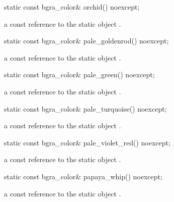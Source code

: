 \begin{itemdecl}
static const bgra_color& orchid() noexcept;
\end{itemdecl}
\begin{itemdescr}
\pnum
\returns
a const reference to the static  object .
\end{itemdescr}

\begin{itemdecl}
static const bgra_color& pale_goldenrod() noexcept;
\end{itemdecl}
\begin{itemdescr}
\pnum
\returns
a const reference to the static  object .
\end{itemdescr}

\begin{itemdecl}
static const bgra_color& pale_green() noexcept;
\end{itemdecl}
\begin{itemdescr}
\pnum
\returns
a const reference to the static  object .
\end{itemdescr}

\begin{itemdecl}
static const bgra_color& pale_turquoise() noexcept;
\end{itemdecl}
\begin{itemdescr}
\pnum
\returns
a const reference to the static  object .
\end{itemdescr}

\begin{itemdecl}
static const bgra_color& pale_violet_red() noexcept;
\end{itemdecl}
\begin{itemdescr}
\pnum
\returns
a const reference to the static  object .
\end{itemdescr}

\begin{itemdecl}
static const bgra_color& papaya_whip() noexcept;
\end{itemdecl}
\begin{itemdescr}
\pnum
\returns
a const reference to the static  object .
\end{itemdescr}


